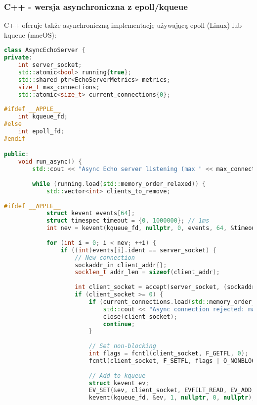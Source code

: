 \subsubsection{C++ - wersja asynchroniczna z epoll/kqueue}
C++ oferuje także asynchroniczną implementację używającą epoll (Linux) lub kqueue (macOS):
\begin{lstlisting}[language=C++, caption={Async Echo Serwer w C++ z event loop}, label={lst:cpp_async_echo_server}]
class AsyncEchoServer {
private:
    int server_socket;
    std::atomic<bool> running{true};
    std::shared_ptr<EchoServerMetrics> metrics;
    size_t max_connections;
    std::atomic<size_t> current_connections{0};
    
#ifdef __APPLE__
    int kqueue_fd;
#else
    int epoll_fd;
#endif

public:
    void run_async() {
        std::cout << "Async Echo server listening (max " << max_connections << " connections)\n";
        
        while (running.load(std::memory_order_relaxed)) {
            std::vector<int> clients_to_remove;
            
#ifdef __APPLE__
            struct kevent events[64];
            struct timespec timeout = {0, 1000000}; // 1ms
            int nev = kevent(kqueue_fd, nullptr, 0, events, 64, &timeout);
            
            for (int i = 0; i < nev; ++i) {
                if ((int)events[i].ident == server_socket) {
                    // New connection
                    sockaddr_in client_addr{};
                    socklen_t addr_len = sizeof(client_addr);
                    
                    int client_socket = accept(server_socket, (sockaddr*)&client_addr, &addr_len);
                    if (client_socket >= 0) {
                        if (current_connections.load(std::memory_order_relaxed) >= max_connections) {
                            std::cout << "Async connection rejected: max capacity reached\n";
                            close(client_socket);
                            continue;
                        }
                        
                        // Set non-blocking
                        int flags = fcntl(client_socket, F_GETFL, 0);
                        fcntl(client_socket, F_SETFL, flags | O_NONBLOCK);
                        
                        // Add to kqueue
                        struct kevent ev;
                        EV_SET(&ev, client_socket, EVFILT_READ, EV_ADD, 0, 0, nullptr);
                        kevent(kqueue_fd, &ev, 1, nullptr, 0, nullptr);
                        

\end{lstlisting}

